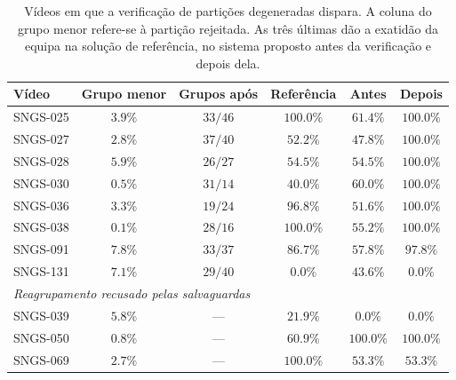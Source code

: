 \begin{table}[htbp]
    \centering
    \caption{Vídeos em que a verificação de partições degeneradas dispara. A coluna do grupo menor
    refere-se à partição rejeitada. As três últimas dão a exatidão da equipa na solução de
    referência, no sistema proposto antes da verificação e depois dela.}
    \label{tab:regressoes}
    \begin{tabular}{|l|c|c|c|c|c|}
        \hline
        \textbf{Vídeo} & \textbf{Grupo menor} & \textbf{Grupos após} & \textbf{Referência} & \textbf{Antes} & \textbf{Depois} \\
        \hline
        SNGS-025 & $3.9\%$ & $33/46$ & $100.0\%$ & $61.4\%$ & $100.0\%$ \\
        \hline
        SNGS-027 & $2.8\%$ & $37/40$ & $52.2\%$ & $47.8\%$ & $100.0\%$ \\
        \hline
        SNGS-028 & $5.9\%$ & $26/27$ & $54.5\%$ & $54.5\%$ & $100.0\%$ \\
        \hline
        SNGS-030 & $0.5\%$ & $31/14$ & $40.0\%$ & $60.0\%$ & $100.0\%$ \\
        \hline
        SNGS-036 & $3.3\%$ & $19/24$ & $96.8\%$ & $51.6\%$ & $100.0\%$ \\
        \hline
        SNGS-038 & $0.1\%$ & $28/16$ & $100.0\%$ & $55.2\%$ & $100.0\%$ \\
        \hline
        SNGS-091 & $7.8\%$ & $33/37$ & $86.7\%$ & $57.8\%$ & $97.8\%$ \\
        \hline
        SNGS-131 & $7.1\%$ & $29/40$ & $0.0\%$ & $43.6\%$ & $0.0\%$ \\
        \hline
        \multicolumn{6}{|l|}{\emph{Reagrupamento recusado pelas salvaguardas}} \\
        \hline
        SNGS-039 & $5.8\%$ & --- & $21.9\%$ & $0.0\%$ & $0.0\%$ \\
        \hline
        SNGS-050 & $0.8\%$ & --- & $60.9\%$ & $100.0\%$ & $100.0\%$ \\
        \hline
        SNGS-069 & $2.7\%$ & --- & $100.0\%$ & $53.3\%$ & $53.3\%$ \\
        \hline
    \end{tabular}
\end{table}


